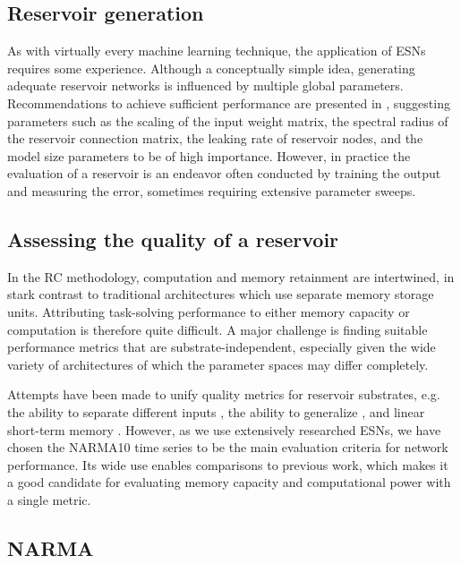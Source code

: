 \subsection{Reservoir generation}

As with virtually every machine learning technique, the application of ESNs
requires some experience. Although a conceptually simple idea, generating
adequate reservoir networks is influenced by multiple global
parameters. Recommendations to achieve sufficient performance are presented in
\cite{montavon_practical_2012, jaeger_tutorial_nodate}, suggesting parameters
such as the scaling of the input weight matrix, the spectral radius of the
reservoir connection matrix, the leaking rate of reservoir nodes, and the model
size parameters to be of high importance. However, in practice the evaluation of
a reservoir is an endeavor often conducted by training the output and measuring
the error, sometimes requiring extensive parameter sweeps.


\subsection{Assessing the quality of a reservoir}

In the RC methodology, computation and memory retainment are intertwined, in
stark contrast to traditional architectures which use separate memory storage
units. Attributing task-solving performance to either memory capacity or
computation is therefore quite difficult. A major challenge is finding suitable
performance metrics that are substrate-independent, especially given the wide
variety of architectures of which the parameter spaces may differ completely.

Attempts have been made to unify quality metrics for reservoir substrates,
e.g. the ability to separate different inputs \cite{legenstein_edge_2007}, the
ability to generalize \cite{legenstein_edge_2007}, and linear short-term memory
\cite{jaeger_short_2002}. However, as we use extensively researched ESNs, we
have chosen the NARMA10 time series to be the main evaluation criteria for
network performance. Its wide use enables comparisons to previous work, which
makes it a good candidate for evaluating memory capacity and computational power
with a single metric.

\subsection{NARMA}


